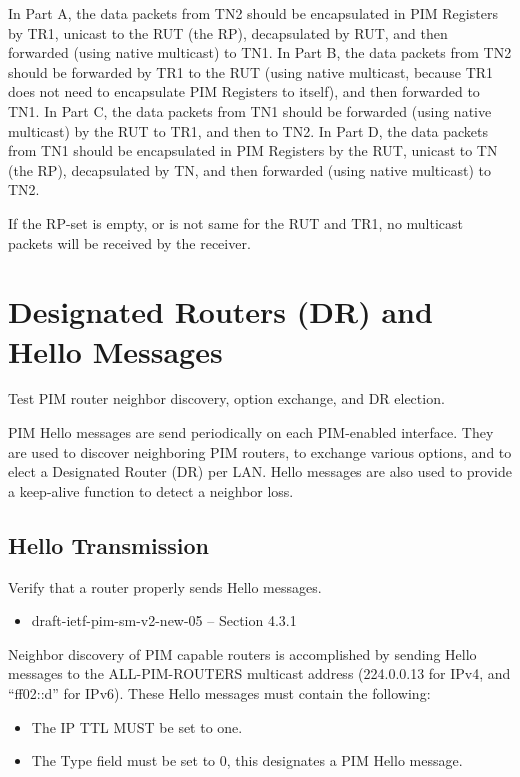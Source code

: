 \documentclass[11pt]{report}
\begin{document}
In Part A, the data packets from TN2 should be encapsulated in PIM Registers
by TR1, unicast to the RUT (the RP), decapsulated by RUT, and then forwarded
(using native multicast) to TN1.
In Part B, the data packets from TN2 should be forwarded by TR1 to the RUT
(using native multicast, because TR1 does not need to encapsulate PIM Registers
to itself), and then forwarded to TN1.
In Part C, the data packets from TN1 should be forwarded (using native
multicast) by the RUT to TR1, and then to TN2.
In Part D, the data packets from TN1 should be encapsulated in PIM Registers
by the RUT, unicast to TN (the RP), decapsulated by TN, and then forwarded
(using native multicast) to TN2.

If the RP-set is empty, or is not same for
the RUT and TR1, no multicast packets will be received by the receiver.

\chapter{Designated Routers (DR) and Hello Messages}

Test PIM router neighbor discovery, option exchange, and DR election.

PIM Hello messages are send periodically on each
PIM-enabled interface. They are used to discover neighboring PIM routers,
to exchange various options, and to elect a Designated Router (DR) per LAN.
Hello messages are also used to provide a keep-alive function to detect a
neighbor loss.

\newpage
\section{Hello Transmission}

Verify that a router properly sends Hello messages.

\begin{itemize}
  \item draft-ietf-pim-sm-v2-new-05 -- Section 4.3.1
\end{itemize}

Neighbor discovery of PIM capable routers is accomplished by sending Hello
messages to the ALL-PIM-ROUTERS multicast address (224.0.0.13 for IPv4,
and ``ff02::d'' for IPv6). These Hello messages must contain the following:
\begin{itemize}

  \item The IP TTL MUST be set to one.

  \item The Type field must be set to 0, this designates a PIM Hello message.

\end{itemize}
\end{document}
